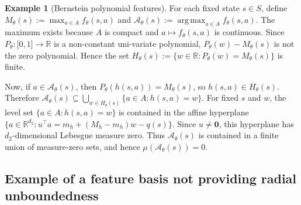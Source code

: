 \documentclass{amsart}
\theoremstyle{definition}
\newtheorem{example}{Example}
\begin{document}
\begin{example}[Bernstein polynomial features]
For each fixed state $s\in S$, define $M_\theta(s):=\max_{a\in A}f_\theta(s,a)$ and $\mathcal A_\theta(s):=\operatorname*{arg\,max}_{a\in A}f_\theta(s,a)$. 
The maximum exists because $A$ is compact and $a\mapsto f_\theta(s,a)$ is continuous. 
Since $P_\theta : \mathbb [0,1] \to \mathbb R$ is a non-constant uni-variate polynomial, $P_\theta(w)-M_\theta(s)$ is not the zero polynomial. Hence the set $H_\theta(s):=\{w\in\mathbb R:P_\theta(w)=M_\theta(s)\}$ is finite.

Now, if $a\in\mathcal A_\theta(s)$, then $P_\theta(h(s,a))=M_\theta(s)$, so $h(s,a)\in H_\theta(s)$. 
Therefore $\mathcal A_\theta(s)\subseteq \bigcup_{w\in H_\theta(s)}\{a\in A:h(s,a)=w\}$. 
For fixed $s$ and $w$, the level set $\{a\in A:h(s,a)=w\}$ is contained in the affine hyperplane $\{a\in\mathbb R^{d_2}:u^\top a=m_h+(M_h-m_h)w-q(s)\}$. 
Since $u\neq  \mathbf 0$, this hyperplane has $d_2$-dimensional Lebesgue measure zero. 
Thus $\mathcal A_\theta(s)$ is contained in a finite union of measure-zero sets, and hence $\mu(\mathcal A_\theta(s))=0$.
\end{example}


\subsection*{Example of a feature basis not providing radial unboundedness} 
\end{document}

